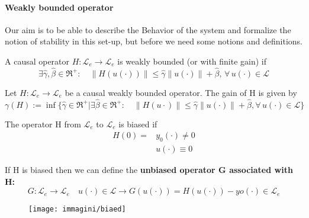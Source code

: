 \paragraph{Weakly bounded operator}
Our aim is to be able to describe the Behavior of the system and formalize  the notion of stability in this set-up, but before we need some notions and definitions.
\begin{defn}
	A causal operator $H:\mathcal{L}_e\to\mathcal{L}_e$ is weakly bounded (or with finite gain) if \[
	\exists \hat{\gamma},\hat{\beta}\in\Re^+:\quad \|H(u(\cdot))\|\le\hat{\gamma}\|u(\cdot)\|+\hat{\beta},\,\forall\, u(\cdot)\in \mathcal{L}
	\]
\end{defn}
\begin{defn}
	Let $H:\mathcal{L}_e\to\mathcal{L}_e$ be a causal weakly bounded operator. The gain of H is given by
	\[\gamma(H):=\inf\{\hat{\gamma}\in\Re^+|\exists\hat{\beta}\in\Re^+:\quad\|H(u\cdot)\|\le\hat{\gamma}\|u(\cdot)\|+\hat{\beta},\forall \, u(\cdot)\in \mathcal{L}\}\]
\end{defn}
\begin{defn}
	The operator H from $\mathcal{L}_e$ to $\mathcal{L}_e$ is biased if
	\[
	\begin{aligned}
		H(0)=&y_0(\cdot)\neq0\\
		&u(\cdot)\equiv0
	\end{aligned}
	\]
\end{defn}
If H is biased then we can define the \textbf{unbiased operator G associated with H:}\[
G:\mathcal{L}_e\to\mathcal{L}_e\quad u(\cdot)\in\mathcal{L}\to G(u(\cdot))=H(u(\cdot))-yo(\cdot)\in \mathcal{L}_e
\]
\begin{figure}[H]
	\centering
	\texttt{[image: immagini/biaed]}
	\caption{}
	\label{fig:biaed}
\end{figure}
